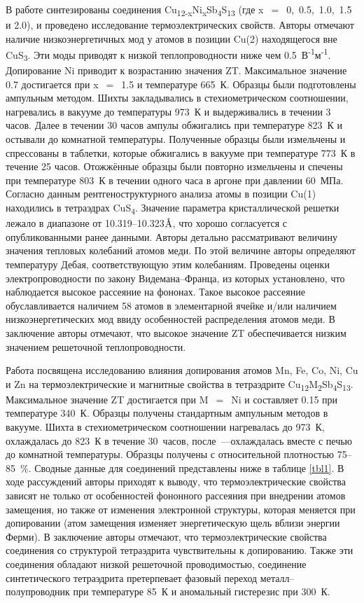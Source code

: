 В работе \cite{Suekuni_2013} синтезированы  соединения Cu\textsubscript{12-x}Ni\textsubscript{x}Sb\textsubscript{4}S\textsubscript{13} (где x~$=$~0,~0.5,~1.0,~1.5 и 2.0), и проведено исследование термоэлектрических свойств. Авторы отмечают наличие низкоэнергетичных мод у атомов в позиции Cu(2) находящегося вне CuS\textsubscript{3}. Эти моды приводят к низкой теплопроводности ниже чем 0.5~В\textsuperscript{-1}м\textsuperscript{-1}. Допирование Ni приводит к возрастанию значения ZT. Максимальное значение 0.7 достигается при x~$=$~1.5 и температуре 665~К. Образцы были подготовлены ампульным методом. Шихты закладывались в стехиометрическом соотношении, нагревались в вакууме до температуры 973~К и выдерживались в течении 3 часов. Далее в течении 30 часов ампулы обжигались при температуре 823~К и остывали до комнатной температуры. Полученные образцы были измельчены и спрессованы в таблетки, которые обжигались в вакууме при температуре 773~К в течение 25 часов. Отожжённые образцы были повторно измельчены и спечены при температуре 803~К в течении одного часа в аргоне при давлении 60~МПа. Согласно данным рентгеноструктурного анализа атомы в позиции Cu(1) находились в тетраэдрах CuS\textsubscript{4}. Значение параметра кристаллической решетки лежало в диапазоне от 10.319--10.323$\mbox{\normalfont\AA}$, что хорошо согласуется с опубликованными ранее данными. Авторы детально рассматривают величину значения тепловых колебаний атомов меди. По этой величине авторы определяют температуру Дебая, соответствующую этим колебаниям. Проведены оценки электропроводности по закону Видемана--Франца, из которых установлено, что наблюдается высокое рассеяние на фононах. Такое высокое рассеяние обуславливается наличием 58 атомов в элементарной ячейке и/или наличием низкоэнергетических мод ввиду особенностей распределения атомов меди. В заключение авторы отмечают, что высокое значение ZT обеспечивается низким значением решеточной теплопроводности.

Работа \cite{Suekuni2012} посвящена исследованию влияния допирования атомов Mn, Fe, Co, Ni, Cu и Zn на термоэлектрические и магнитные свойства в тетраэдрите Cu\textsubscript{12}M\textsubscript{2}Sb\textsubscript{4}S\textsubscript{13}.
Максимальное значение ZT достигается при M~$=$~Ni и составляет 0.15 при температуре 340~К.
Образцы получены стандартным ампульным методов в вакууме. Шихта в стехиометрическом соотношении нагревалась до 973~К, охлаждалась до 823~К в течение 30~часов, после~---охлаждалась вместе с печью до комнатной температуры.
Образцы получены с относительной плотностью 75--85~\%.
Сводные данные для соединений представлены ниже в таблице \ref{tbl1}.
В ходе рассуждений авторы приходят к выводу, что термоэлектрические свойства зависят не только от особенностей фононного рассеяния при внедрении атомов замещения, но также от изменения электронной структуры, которая меняется при допировании (атом замещения изменяет энергетическую щель вблизи энергии Ферми).
В заключение авторы отмечают, что термоэлектрические свойства соединения со структурой тетраэдрита чувствительны к допированию. Также эти соединения обладают низкой решеточной проводимостью, соединение синтетического тетраэдрита претерпевает фазовый переход металл--полупроводник при температуре 85~К и аномальный гистерезис при 300~К.


